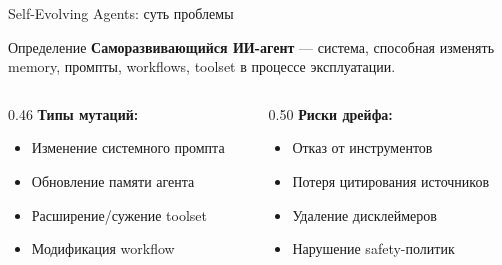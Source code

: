 \documentclass[aspectratio=169, 12pt]{beamer}
\begin{document}
\begin{frame}{Self-Evolving Agents: суть проблемы}
  \small
  \begin{block}{Определение}
    \textbf{Саморазвивающийся ИИ-агент} --- система, способная изменять memory, промпты, workflows, toolset в процессе эксплуатации.
  \end{block}

  \vspace{0.2cm}
  \begin{columns}[T]
    \begin{column}{0.46\textwidth}
      \textbf{Типы мутаций:}
      \begin{itemize}\setlength\itemsep{2pt}
        \item Изменение системного промпта
        \item Обновление памяти агента
        \item Расширение/сужение toolset
        \item Модификация workflow
      \end{itemize}
    \end{column}
    \begin{column}{0.50\textwidth}
      \textbf{Риски дрейфа:}
      \begin{itemize}\setlength\itemsep{2pt}
        \item[\textcolor{warnred}{$\times$}] Отказ от инструментов
        \item[\textcolor{warnred}{$\times$}] Потеря цитирования источников
        \item[\textcolor{warnred}{$\times$}] Удаление дисклеймеров
        \item[\textcolor{warnred}{$\times$}] Нарушение safety-политик
      \end{itemize}
    \end{column}
  \end{columns}
\end{frame}
\end{document}
